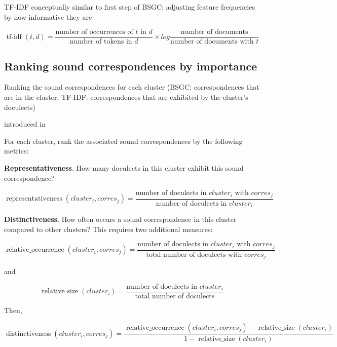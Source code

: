 \documentclass{article}
\begin{document}
TF-IDF conceptually similar to first step of BSGC: adjusting feature frequencies by how informative they are

\begin{equation*}
\operatorname{tf-idf}(t, d) =
\frac{\text{number of occurrences of } t \text{ in } d}
{\text{number of tokens in } d}
\times
log
\frac{\text{number of documents}}
{\text{number of documents with } t}
\end{equation*}

\subsection{Ranking sound correspondences by importance}

Ranking the sound correspondences for each cluster
(BSGC: correspondences that are in the cluster,
TF-IDF: correspondences that are exhibited by the cluster's doculects)

introduced in \cite{wieling2011bipartite}

For each cluster, rank the associated sound correspondences by the following metrics:

\textbf{Representativeness}.
How many doculects in this cluster exhibit this sound correspondence?

\begin{equation*}
\operatorname{representativeness}(cluster_i, corres_j) = 
\frac{\text{number of doculects in } cluster_i \text{ with }  corres_j}
{\text{number of doculects in }  cluster_i}
\end{equation*}

\textbf{Distinctiveness}.
How often occurs a sound correspondence in this cluster compared to other clusters? 
This requires two additional measures: 

\begin{equation*}
\operatorname{relative\_occurrence}(cluster_i, corres_j) = 
\frac{\text{number of doculects in } cluster_i \text{ with }  corres_j}
{\text{total number of doculects with } corres_j}
\end{equation*}

and

\begin{equation*}
\operatorname{relative\_size}(cluster_i) = 
\frac{\text{number of doculects in } cluster_i}
{\text{total number of doculects}}
\end{equation*}

Then, 

\begin{equation*}
\operatorname{distinctiveness}(cluster_i, corres_j) = 
\frac{\operatorname{relative\_occurrence}(cluster_i, corres_j) - \operatorname{relative\_size}(cluster_i)}
{1 - \operatorname{relative\_size}(cluster_i)}
\end{equation*}
\end{document}
